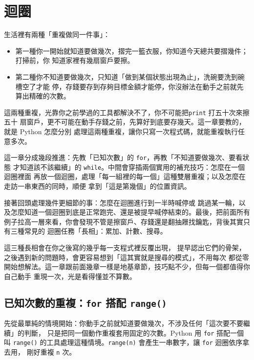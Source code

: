 \chapter{迴圈}
\label{ch:loops}

生活裡有兩種「重複做同一件事」：

\begin{itemize}
\item 第一種你一開始就知道要做幾次，摺完一籃衣服，你知道今天總共要摺幾件；打掃前，你
知道家裡有幾扇窗戶要擦。
\item 第二種你不知道要做幾次，只知道「做到某個狀態出現為止」，洗碗要洗到碗槽空了才能
停，存錢要存到存夠目標金額才能停，你沒辦法在動手之前就先算出精確的次數。
\end{itemize}

這兩種重複，光靠你之前學過的工具都解決不了，你不可能把\texttt{print} 打五十次來擦五十
扇窗戶，更不可能在動手存錢之前，先算好到底要存幾天。這一章要教的，就是 Python 怎麼分別
處理這兩種重複，讓你只寫一次程式碼，就能重複執行任意多次。

這一章分成幾段推進：先教「已知次數」的 \texttt{for}，再教「不知道要做幾次、要看狀態
才知道該不該繼續」的 \texttt{while}。中間會穿插兩個實用的補充技巧：怎麼在一個迴圈裡面
再放一個迴圈，處理「每一組裡的每一個」這種雙層重複；以及怎麼在走訪一串東西的同時，順便
拿到「這是第幾個」的位置資訊。

接著回頭處理幾件更細節的事：怎麼在迴圈進行到一半時喊停或
跳過某一輪，以及怎麼知道一個迴圈到底是正常跑完、還是被提早喊停結束的。最後，把前面所有
例子拉高一層來看，你會發現不管是擦窗戶、存錢還是翻抽屜找鑰匙，背後其實只有三種常見的
迴圈任務「長相」：累加、計數、搜尋。

這三種長相會在你之後寫的幾乎每一支程式裡反覆出現，
提早認出它們的骨架，之後遇到新的問題時，會更容易想到「這其實就是搜尋的模式」，不用每次
都從零開始想解法。這一章跟前面幾章一樣是地基章節，技巧點不少，但每一個都值得你自己動手
重現一次，光是看得懂並不算數。

\section{已知次數的重複：\texttt{for} 搭配 \texttt{range()}}
\label{sec:for-range}

先從最單純的情境開始：你動手之前就知道要做幾次，不涉及任何「這次要不要繼續」的判斷，
只是把同一個動作重複套用固定的次數。Python 用 \texttt{for} 搭配一個叫 \texttt{range()}
的工具處理這種情境。\texttt{range(n)} 會產生一串數字，讓 \texttt{for} 迴圈依序拿去用，
剛好重複 \texttt{n} 次。

